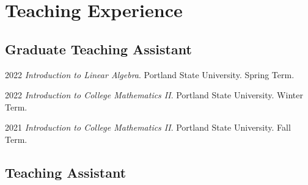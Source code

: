 \documentclass[12pt,letterpaper]{report}
\begin{document}
    \section*{Teaching Experience}

    \subsection*{Graduate Teaching Assistant}

    \begin{tablist}

        \item[2022] \tab \emph{Introduction to Linear Algebra}. Portland State University. Spring Term.

        \item[2022] \tab \emph{Introduction to College Mathematics II}. Portland State University. Winter Term.

        \item[2021] \tab \emph{Introduction to College Mathematics II}. Portland State University. Fall Term. 
    
    \end{tablist}

    \subsection*{Teaching Assistant}
\end{document}
